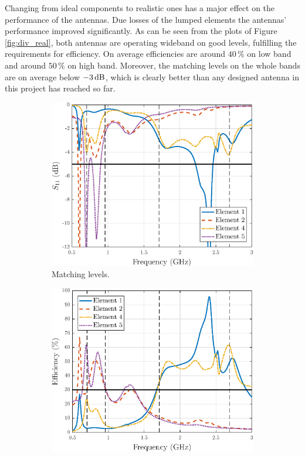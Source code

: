 Changing from ideal components to realistic ones has a major effect on the performance of the antennas. Due losses of the lumped elements the antennas' performance improved significantly. As can be seen from the plots of Figure \ref{fig:div_real}, both antennas are operating wideband on good levels, fulfilling the requirements for efficiency. On average efficiencies are around $40\,\%$ on low band and around $50\,\%$ on high band. Moreover, the matching levels on the whole bands are on average below $-3\,\mathrm{dB}$, which is clearly better than any designed antenna in this project has reached so far.

\begin{figure}[H]
    \centering
    \begin{subfigure}[b]{0.49\textwidth}
        \includegraphics[width=\textwidth]{img/diversity_final_real_match.eps}
        \caption{Matching levels.}
        \label{fig:div_match_real}
    \end{subfigure}
    \begin{subfigure}[b]{0.49\textwidth}
        \includegraphics[width=\textwidth]{img/diversity_eff_real.eps}

\end{subfigure}
\end{figure}
